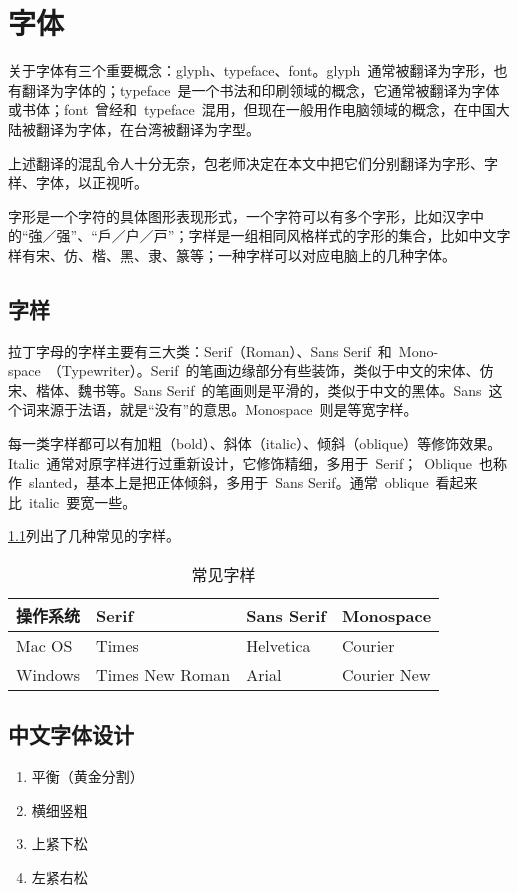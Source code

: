 \newcommand{\MF}{MetaFont}
\chapter{字体}

关于字体有三个重要概念：glyph、typeface、font。glyph~通常被翻译为字形，也有翻译为字体的；typeface~是一个书法和印刷领域的概念，它通常被翻译为字体或书体；font~曾经和~typeface~混用，但现在一般用作电脑领域的概念，在中国大陆被翻译为字体，在台湾被翻译为字型。

上述翻译的混乱令人十分无奈，包老师决定在本文中把它们分别翻译为字形、字样、字体，以正视听。

字形是一个字符的具体图形表现形式，一个字符可以有多个字形，比如汉字中的“強／强”、“戶／户／戸”；字样是一组相同风格样式的字形的集合，比如中文字样有宋、仿、楷、黑、隶、篆等；一种字样可以对应电脑上的几种字体。


\section{字样}
\label{sec:typeface}
拉丁字母的字样主要有三大类：Serif（Roman）、Sans Serif~和~Mono-space~（Typewriter）。Serif~的笔画边缘部分有些装饰，类似于中文的宋体、仿宋、楷体、魏书等。Sans Serif~的笔画则是平滑的，类似于中文的黑体。Sans~这个词来源于法语，就是“没有”的意思。Monospace~则是等宽字样。

每一类字样都可以有加粗（bold）、斜体（italic）、倾斜（oblique）等修饰效果。Italic~通常对原字样进行过重新设计，它修饰精细，多用于~Serif；~Oblique~也称作~slanted，基本上是把正体倾斜，多用于~Sans Serif。通常~oblique~看起来比~italic~要宽一些。

\ref{tab:typeface}列出了几种常见的字样。

\begin{table}[htbp]
\caption{常见字样}
\label{tab:typeface}
\centering
\begin{tabular}{llll}
    \toprule
    操作系统 & Serif           & Sans Serif & Monospace \\
    \midrule
    Mac OS   & Times           & Helvetica  & Courier \\
    Windows  & Times New Roman & Arial      & Courier New \\
    \bottomrule
\end{tabular}
\end{table}

\section{中文字体设计}
\begin{enumerate}
    \item 平衡（黄金分割）
    \item 横细竖粗
    \item 上紧下松
    \item 左紧右松
\end{enumerate}

